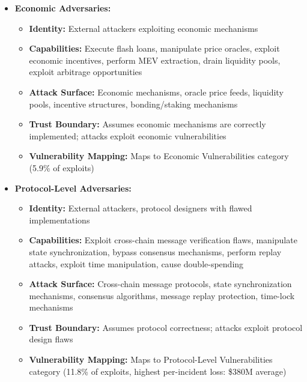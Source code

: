 \documentclass[runningheads]{llncs}
\begin{document}
\begin{itemize}
    \item \textbf{Economic Adversaries:}
    \begin{itemize}
        \item \textbf{Identity:} External attackers exploiting economic mechanisms
        \item \textbf{Capabilities:} Execute flash loans, manipulate price oracles, exploit economic incentives, perform MEV extraction, drain liquidity pools, exploit arbitrage opportunities
        \item \textbf{Attack Surface:} Economic mechanisms, oracle price feeds, liquidity pools, incentive structures, bonding/staking mechanisms
        \item \textbf{Trust Boundary:} Assumes economic mechanisms are correctly implemented; attacks exploit economic vulnerabilities
        \item \textbf{Vulnerability Mapping:} Maps to Economic Vulnerabilities category (5.9\% of exploits)
    \end{itemize}
    
    \item \textbf{Protocol-Level Adversaries:}
    \begin{itemize}
        \item \textbf{Identity:} External attackers, protocol designers with flawed implementations
        \item \textbf{Capabilities:} Exploit cross-chain message verification flaws, manipulate state synchronization, bypass consensus mechanisms, perform replay attacks, exploit time manipulation, cause double-spending
        \item \textbf{Attack Surface:} Cross-chain message protocols, state synchronization mechanisms, consensus algorithms, message replay protection, time-lock mechanisms
        \item \textbf{Trust Boundary:} Assumes protocol correctness; attacks exploit protocol design flaws
        \item \textbf{Vulnerability Mapping:} Maps to Protocol-Level Vulnerabilities category (11.8\% of exploits, highest per-incident loss: \$380M average)
    \end{itemize}
\end{itemize}
\end{document}
